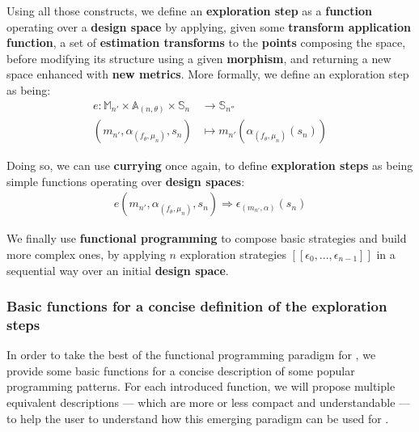             Using all those constructs, we define an {\bf exploration step} as a {\bf function} operating over a {\bf design space} by applying, given some {\bf transform application function}, a set of {\bf estimation transforms} to the {\bf points} composing the space, before modifying its structure using a given {\bf morphism}, and returning a new space enhanced with {\bf new metrics}.
            More formally, we define an exploration step as being:
            \begin{equation}
                \label{ch.dse:sec.functional:ssec.formalization:eq.exploration}
                \begin{split}
                    e: \mathbb{M}_{n'} \times \mathbb{A}_{(n, \theta)} \times \mathbb{S}_n & \rightarrow \mathbb{S}_{n''}\\
                    (m_{n'}, \alpha_{(f_\theta, \mu_n)}, s_n) & \mapsto m_{n'}(\alpha_{(f_\theta, \mu_n)}(s_n))
                \end{split}
            \end{equation}

            Doing so, we can use {\bf currying} once again, to define {\bf exploration steps} as being simple functions operating over {\bf design spaces}:
            \begin{equation}
                \label{ch.dse:sec.functional:ssec.formalization:eq.explo}
                \begin{split}
                    e(m_{n'}, \alpha_{(f_\theta, \mu_n)}, s_n) \Rightarrow \epsilon_{(m_{n'}, \alpha)}(s_n)
                \end{split}
            \end{equation}

            We finally use {\bf functional programming} to compose basic strategies and build more complex ones, by applying $n$ exploration strategies $[\![\epsilon_0, ..., \epsilon_{n-1} ]\!]$ in a sequential way over an initial {\bf design space}.

        \subsubsection{Basic functions for a concise definition of the exploration steps}
            In order to take the best of the functional programming paradigm for , we provide some basic functions for a concise description of some popular programming patterns.
            For each introduced function, we will propose multiple equivalent descriptions --- which are more or less compact and understandable --- to help the user to understand how this emerging paradigm can be used for .

